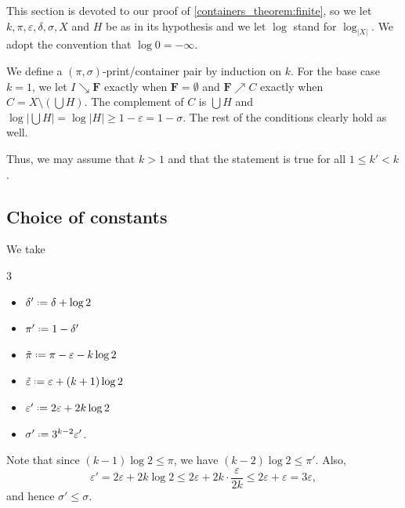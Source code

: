\documentclass[12pt,reqno]{amsart}
\theoremstyle{plain}
\theoremstyle{definition}
\theoremstyle{remark}
\newtheorem{claim}[equation]{Claim}
\newcommand{\0}{\mathbb{\emptyset}}
\newcommand*{\defeq}{\mathrel{\vcenter{\baselineskip0.5ex \lineskiplimit0pt \hbox{\scriptsize.}\hbox{\scriptsize.}}}=}
\newcommand{\de}{\delta}
\newcommand{\e}{\varepsilon}
\newcommand{\si}{\sigma}
\newcommand{\logX}{\log_{|X|}}
\newcommand{\Print}{\boldsymbol{F}}
\newcommand{\eqcomment}[2][6pt]{\Big[\text{#2}\Big] \hspace{#1}}
\newcommand{\prel}{\searrow}
\newcommand{\crel}{\nearrow}
\begin{document}
\noindent This section is devoted to our proof of \cref{containers_theorem:finite}, so we let $k, \pi, \e, \de, \si, X$ and $H$ be as in its hypothesis and we let $\log$ stand for $\logX$. We adopt the convention that $\log 0 = - \infty$.

We define a $(\pi,\si)$-print/container pair by induction on $k$. For the base case $k = 1$, we let $I \prel \Print$ exactly when $\Print = \0$ and $\Print \crel C$ exactly when $C = X \setminus \left(\bigcup H\right)$. The complement of $C$ is $\bigcup H$ and $\log \left|\bigcup H\right| = \log |H| \ge 1 - \e = 1 - \si$. The rest of the conditions clearly hold as well.

Thus, we may assume that $k > 1$ and that the statement is true for all $1 \le k' < k$. 

\subsection{Choice of constants}\label{subsec:constants}

We take
\setlength{\columnsep}{-2cm}
\begin{multicols}{3}
	\begin{itemize}[labelindent=1em]	
		\item $\de' \defeq \de + \log 2$
		
		\item $\pi' \defeq 1 - \de'$
		
		\item $\tilde\pi \defeq \pi - \e - k \log 2$
		
		\item $\tilde\e \defeq \e + (k+1) \log 2$
		
		\item $\e' \defeq 2\e + 2k\log 2$
		
		\item $\si' \defeq 3^{k-2} \e'$.
	\end{itemize}
\end{multicols}

\noindent Note that since $(k-1)\log 2 \leq \pi$, we have $(k-2)\log 2 \leq \pi'$. Also,
\[
\e' = 2\e + 2k\log 2 \le 
2 \e + 2k \cdot \frac{\e}{2k} \le 2 \e + \e = 3\e,
\]
and hence $\si' \leq \si$.

\end{document}
